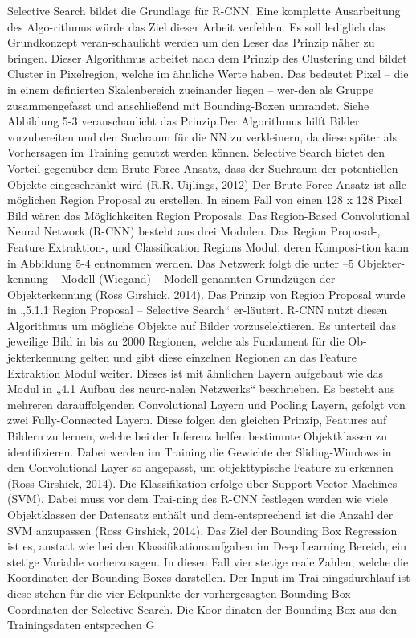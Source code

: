 \documentclass{llncs}
\begin{document}
Selective Search bildet die Grundlage für R-CNN. Eine komplette Ausarbeitung des Algo-rithmus würde das Ziel dieser Arbeit verfehlen. Es soll lediglich das Grundkonzept veran-schaulicht werden um den Leser das Prinzip näher zu bringen. Dieser Algorithmus arbeitet nach dem Prinzip des Clustering und bildet Cluster in Pixelregion, welche im ähnliche Werte haben. Das bedeutet Pixel – die in einem definierten Skalenbereich zueinander liegen – wer-den als Gruppe zusammengefasst und anschließend mit Bounding-Boxen umrandet. Siehe Abbildung 5-3 veranschaulicht das Prinzip.Der Algorithmus hilft Bilder vorzubereiten und den Suchraum für die NN zu verkleinern, da diese später als Vorhersagen im Training genutzt werden können. Selective Search bietet den Vorteil gegenüber dem Brute Force Ansatz, dass der Suchraum der potentiellen Objekte eingeschränkt wird (R.R. Uijlings, 2012)
Der Brute Force Ansatz ist alle möglichen Region Proposal zu erstellen. In einem Fall von einen 128 x 128 Pixel Bild wären das Möglichkeiten Region Proposals.
Das Region-Based Convolutional Neural Network (R-CNN) besteht aus drei Modulen. Das Region Proposal-, Feature Extraktion-, und Classification Regions Modul, deren Komposi-tion kann in Abbildung 5-4 entnommen werden. Das Netzwerk folgt die unter –5 Objekter-kennung – Modell (Wiegand) – Modell genannten Grundzügen der Objekterkennung (Ross Girshick, 2014).
Das Prinzip von Region Proposal wurde in „5.1.1 Region Proposal – Selective Search“ er-läutert. R-CNN nutzt diesen Algorithmus um mögliche Objekte auf Bilder vorzuselektieren. Es unterteil das jeweilige Bild in bis zu 2000 Regionen, welche als Fundament für die Ob-jekterkennung gelten und gibt diese einzelnen Regionen an das Feature Extraktion Modul weiter. Dieses ist mit ähnlichen Layern aufgebaut wie das Modul in „4.1 Aufbau des neuro-nalen Netzwerks“ beschrieben. Es besteht aus mehreren darauffolgenden Convolutional Layern und Pooling Layern, gefolgt von zwei Fully-Connected Layern. Diese folgen den gleichen Prinzip, Features auf Bildern zu lernen, welche bei der Inferenz helfen bestimmte Objektklassen zu identifizieren. Dabei werden im Training die Gewichte der Sliding-Windows in den Convolutional Layer so angepasst, um objekttypische Feature zu erkennen (Ross Girshick, 2014).
Die Klassifikation erfolge über Support Vector Machines (SVM). Dabei muss vor dem Trai-ning des R-CNN festlegen werden wie viele Objektklassen der Datensatz enthält und dem-entsprechend ist die Anzahl der SVM anzupassen (Ross Girshick, 2014).
Das Ziel der Bounding Box Regression ist es, anstatt wie bei den Klassifikationsaufgaben im Deep Learning Bereich, ein stetige Variable vorherzusagen. In diesen Fall vier stetige reale Zahlen, welche die Koordinaten der Bounding Boxes darstellen. Der Input im Trai-ningsdurchlauf ist diese stehen für die vier Eckpunkte der vorhergesagten Bounding-Box Coordinaten der Selective Search. Die Koor-dinaten der Bounding Box aus den Trainingsdaten entsprechen G 
\end{document}
